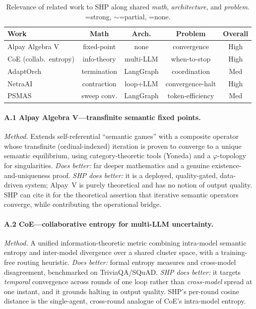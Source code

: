 \documentclass[conference]{IEEEtran}
\begin{document}
\begin{table}[h]
\centering\scriptsize
\caption{Relevance of related work to SHP along shared \emph{math},
\emph{architecture}, and \emph{problem}. =strong, $\sim$=partial,
=none.}
\label{tab:related}
\setlength{\tabcolsep}{4pt}
\begin{tabular}{lcccc}
\toprule
Work & Math & Arch. & Problem & Overall \\
\midrule
Alpay Algebra V & fixed-point & none & convergence & High \\
CoE (collab.\ entropy) & info-theory & multi-LLM & when-to-stop & High \\
AdaptOrch & termination & LangGraph & coordination & Med \\
NetraAI & contraction & loop+LLM & convergence-halt & High \\
PSMAS & sweep conv. & LangGraph & token-efficiency & Med \\
\bottomrule
\end{tabular}
\end{table}

\paragraph{A.1 Alpay Algebra V---transfinite semantic fixed points.}
\emph{Method.} Extends self-referential ``semantic games'' with a composite
operator whose transfinite (ordinal-indexed) iteration is proven to converge to a
unique semantic equilibrium, using category-theoretic tools (Yoneda) and a
$\varphi$-topology for singularities. \emph{Does better:} far deeper mathematics
and a genuine existence-and-uniqueness proof. \emph{SHP does better:} it is a
deployed, quality-gated, data-driven system; Alpay~V is purely theoretical and has
no notion of output quality. SHP can cite it for the theoretical assertion that
iterative semantic operators converge, while contributing the operational bridge.

\paragraph{A.2 CoE---collaborative entropy for multi-LLM uncertainty.}
\emph{Method.} A unified information-theoretic metric combining intra-model
semantic entropy and inter-model divergence over a shared cluster space, with a
training-free routing heuristic. \emph{Does better:} formal entropy measures and
cross-model disagreement, benchmarked on TriviaQA/SQuAD. \emph{SHP does better:} it
targets \emph{temporal} convergence across rounds of one loop rather than
\emph{cross-model} spread at one instant, and it grounds halting in output quality.
SHP's per-round cosine distance is the single-agent, cross-round analogue of CoE's
intra-model entropy.
\end{document}
